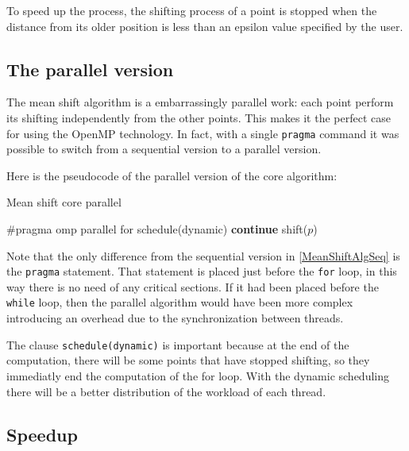 \documentclass[10pt,twocolumn,letterpaper]{article}
\begin{document}
To speed up the process, the shifting process of a point is stopped when the distance from its older position is less than an epsilon value specified by the user.


\subsection{The parallel version}

The mean shift algorithm is a embarrassingly parallel work: each point perform its shifting independently from the other points. This makes it the perfect case for using the OpenMP technology. In fact, with a single \verb"pragma" command it was possible to switch from a sequential version to a parallel version.

Here is the pseudocode of the parallel version of the core algorithm:

\begin{algorithm}
\label{MeanShiftAlgPar}
\caption{Mean shift core parallel}
\begin{algorithmic}

		\State \#pragma omp parallel for schedule(dynamic)
    				\State \textbf{continue}
    			\EndIf
    		\State shift($p$)
    		\EndFor
    \EndWhile

\end{algorithmic}
\end{algorithm}

Note that the only difference from the sequential version in \ref{MeanShiftAlgSeq} is the \verb"pragma" statement. That statement is placed just before the \verb"for" loop, in this way there is no need of any critical sections. If it had been placed before the \verb"while" loop, then the parallel algorithm would have been more complex introducing an overhead due to the synchronization between threads.

The clause \verb"schedule(dynamic)" is important because at the end of the computation, there will be some points that have stopped shifting, so they immediatly end the computation of the for loop. With the dynamic scheduling there will be a better distribution of the workload of each thread.

\subsection{Speedup}
\end{document}
